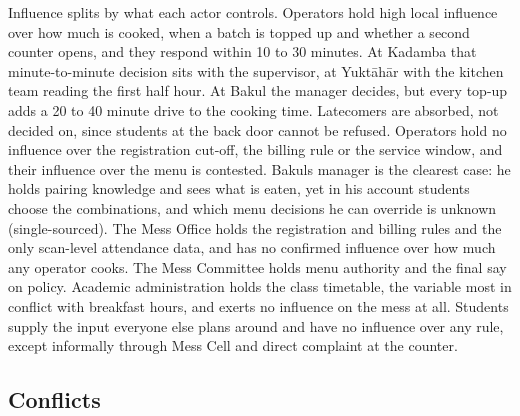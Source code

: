 \documentclass[
  10pt,
  table]{article}
\begin{document}
Influence splits by what each actor controls. Operators hold high local influence over how much is cooked, when a batch is topped up and whether a second counter opens, and they respond within 10 to 30 minutes. At Kadamba that minute-to-minute decision sits with the supervisor, at Yuktāhār with the kitchen team reading the first half hour. At Bakul the manager decides, but every top-up adds a 20 to 40 minute drive to the cooking time. Latecomers are absorbed, not decided on, since students at the back door cannot be refused. Operators hold no influence over the registration cut-off, the billing rule or the service window, and their influence over the menu is contested. Bakul\textquotesingle s manager is the clearest case: he holds pairing knowledge and sees what is eaten, yet in his account students choose the combinations, and which menu decisions he can override is unknown (single-sourced). The Mess Office holds the registration and billing rules and the only scan-level attendance data, and has no confirmed influence over how much any operator cooks. The Mess Committee holds menu authority and the final say on policy. Academic administration holds the class timetable, the variable most in conflict with breakfast hours, and exerts no influence on the mess at all. Students supply the input everyone else plans around and have no influence over any rule, except informally through Mess Cell and direct complaint at the counter.

\subsection{Conflicts}\label{conflicts}
\end{document}
